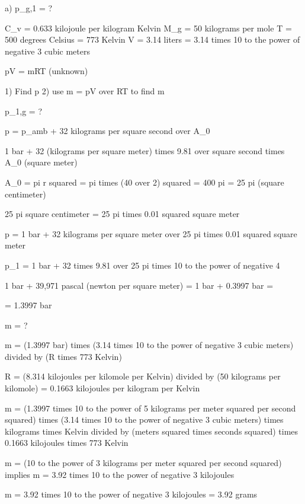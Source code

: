 a) p_g,1 = ?

C_v = 0.633 kilojoule per kilogram Kelvin  
M_g = 50 kilograms per mole  
T = 500 degrees Celsius = 773 Kelvin  
V = 3.14 liters = 3.14 times 10 to the power of negative 3 cubic meters  

pV = mRT  
(unknown)  

1) Find p  
2) use m = pV over RT to find m  

p_1,g = ?  

p = p_amb + 32 kilograms per square second over A_0  

1 bar + 32 (kilograms per square meter) times 9.81 over square second times A_0 (square meter)  

A_0 = pi r squared = pi times (40 over 2) squared = 400 pi = 25 pi (square centimeter)  

25 pi square centimeter = 25 pi times 0.01 squared square meter  

p = 1 bar + 32 kilograms per square meter over 25 pi times 0.01 squared square meter  

p_1 = 1 bar + 32 times 9.81 over 25 pi times 10 to the power of negative 4  

1 bar + 39,971 pascal (newton per square meter) = 1 bar + 0.3997 bar =  

= 1.3997 bar

m = ?

m = (1.3997 bar) times (3.14 times 10 to the power of negative 3 cubic meters) divided by (R times 773 Kelvin)

R = (8.314 kilojoules per kilomole per Kelvin) divided by (50 kilograms per kilomole) = 0.1663 kilojoules per kilogram per Kelvin

m = (1.3997 times 10 to the power of 5 kilograms per meter squared per second squared) times (3.14 times 10 to the power of negative 3 cubic meters) times kilograms times Kelvin divided by (meters squared times seconds squared) times 0.1663 kilojoules times 773 Kelvin

m = (10 to the power of 3 kilograms per meter squared per second squared) implies m = 3.92 times 10 to the power of negative 3 kilojoules

m = 3.92 times 10 to the power of negative 3 kilojoules = 3.92 grams